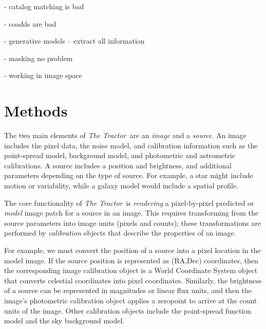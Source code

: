 \documentclass[modern, linenumbers]{aastex631}
\newcommand{\thetractor}{\emph{The Tractor}}
\begin{document}
- catalog matching is bad

- coadds are bad

- generative models -- extract all information

- masking no problem

- working in image space

\cite{2009AJ....137.4400L}

\section{Methods}


The two main elements of \thetractor\ are an \emph{image} and a
\emph{source}.  An image includes the pixel data, the noise model, and
calibration information such as the point-spread model, background
model, and photometric and astrometric calibrations.  A source
includes a position and brightness, and additional parameters
depending on the type of source.  For example, a star might include
motion or variability, while a galaxy model would include a spatial
profile.


The core functionality of \thetractor\ is \emph{rendering} a
pixel-by-pixel predicted or \emph{model} image patch for a source in
an image.  This requires transforming from the source parameters into
image units (pixels and counts); these transformations are performed
by \emph{calibration} objects that describe the properties of an
image.

For example, we must convert the position of a source into a pixel
location in the model image.  If the source position is represented as
(RA,Dec) coordinates, then the corresponding image calibration object
is a World Coordinate System object that converts celestial
coordinates into pixel coordinates.  Similarly, the brightness of a
source can be represented in magnitudes or linear flux units, and then
the image's photometric calibration object applies a zeropoint to
arrive at the count units of the image.  Other calibration objects
include the point-spread function model and the sky background model.
\end{document}
